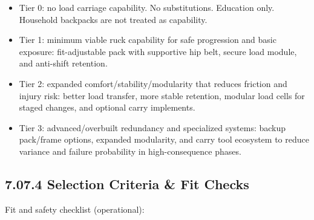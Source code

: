 \documentclass[10pt]{article}
\begin{document}
\begin{itemize}
\item Tier 0: no load carriage capability. No substitutions. Education only. Household backpacks are not treated as capability.
\item Tier 1: minimum viable ruck capability for safe progression and basic exposure: fit-adjustable pack with supportive hip belt, secure load module, and anti-shift retention.
\item Tier 2: expanded comfort/stability/modularity that reduces friction and injury risk: better load transfer, more stable retention, modular load cells for staged changes, and optional carry implements.
\item Tier 3: advanced/overbuilt redundancy and specialized systems: backup pack/frame options, expanded modularity, and carry tool ecosystem to reduce variance and failure probability in high-consequence phases.
\end{itemize}

\subsection*{7.07.4 Selection Criteria \& Fit Checks}
{}

Fit and safety checklist (operational):
\end{document}
